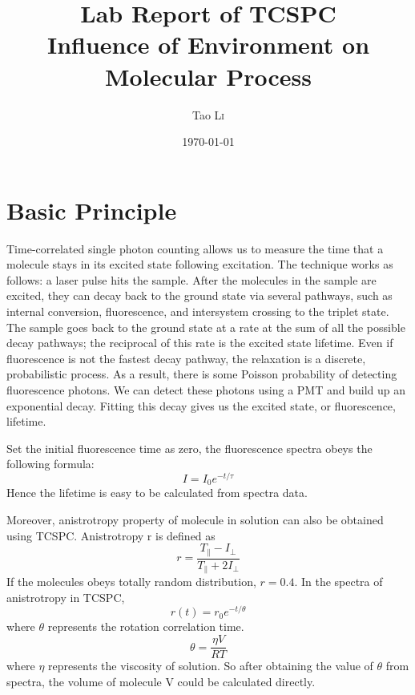 \documentclass{article}
\title{Lab Report of TCSPC \\ Influence of Environment on Molecular Process} %
\author{Tao \textsc{Li}} %
\date{\today} %
\begin{document}
\maketitle %



 
\section{Basic Principle}
Time-correlated single photon counting allows us to measure the time that a molecule stays in its excited state following excitation. The technique works as follows: a laser pulse hits the sample.  After the molecules in the sample are excited, they can decay back to the ground state via several pathways, such as internal conversion, fluorescence, and intersystem crossing to the triplet state.  The sample goes back to the ground state at a rate at the sum of all the possible decay pathways; the reciprocal of this rate is the excited state lifetime. Even if fluorescence is not the fastest decay pathway, the relaxation is a discrete, probabilistic process.  As a result, there is some Poisson probability of detecting fluorescence photons.  We can detect these photons using a PMT and build up an exponential decay.  Fitting this decay gives us the excited state, or fluorescence, lifetime. \par 
Set the initial fluorescence time as zero, the fluorescence spectra obeys the following formula:
\begin{equation}
I=I_{0}e^{-t/\tau}
\end{equation}
Hence the lifetime is easy to be calculated from spectra data.\par 
Moreover, anistrotropy property of molecule in solution can also be obtained using TCSPC. Anistrotropy r is defined as
\begin{equation}
r=\frac{T_{\parallel}-I_{\perp}}{T_{\parallel}+2I_{\perp}}
\end{equation}
If the molecules obeys totally random distribution, $r=0.4$. In the spectra of anistrotropy in TCSPC, 
\begin{equation}
r(t)=r_{0}e^{-t/\theta}
\end{equation}
where $\theta$ represents the rotation correlation time.
\begin{equation}
\theta =\frac{\eta V}{RT}
\end{equation}
where $\eta$ represents the viscosity of solution. So after obtaining the value of $\theta$ from spectra, the volume of molecule V could be calculated directly.
\end{document}
